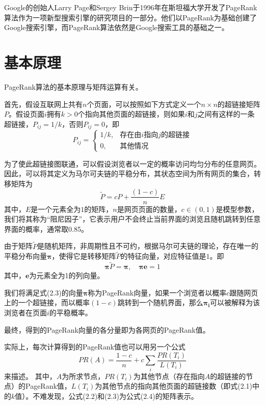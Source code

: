 \documentclass[UTF8,openany]{ctexbook}
\begin{document}
Google的创始人Larry Page和Sergey Brin于1996年在斯坦福大学开发了PageRank算法作为一项新型搜索引擎的研究项目的一部分。他们以PageRank为基础创建了Google搜索引擎，而PageRank算法依然是Google搜索工具的基础之一。

\section[基本原理]{基本原理}

PageRank算法的基本原理与矩阵运算有关。

首先，假设互联网上共有$n$个页面，可以按照如下方式定义一个$n \times n$的超链接矩阵$P$。假设页面$i$拥有$k>0$个指向其他页面的超链接，则如果$i$和$j$之间有这样的一条超链接，$P_{ij}=1/k$，否则$P_{ij}=0$，即
\begin{equation}
    P_{ij}=\begin{cases}
        1/k, & \text{存在由$i$指向$j$的超链接} \\
        0,   & \text{其他情况}
    \end{cases}
\end{equation}

为了使此超链接图联通，可以假设浏览者以一定的概率访问均匀分布的任意网页。因此，可以将其定义为马尔可夫链的平稳分布，其状态空间为所有网页的集合，转移矩阵为
\begin{equation}
    \widetilde{P}=cP+\frac{(1-c)}{n}E
\end{equation}
其中，$E$是一个元素全为$1$的矩阵，$n$是网页页面的数量，$c \in (0,1)$是模型参数，我们将其称为“阻尼因子”，它表示用户不会终止当前界面的浏览且随机跳转到任意界面的概率，通常取0.85\cite{bi:G}。

由于矩阵$\widetilde{P}$是随机矩阵，非周期性且不可约，根据马尔可夫链的理论\cite{bi:RA}，存在唯一的平稳分布向量$\boldsymbol{\pi}$，使得它是转移矩阵$\widetilde{P}$的特征向量，对应特征值是$1$\cite{bi:DGPOLS}。即
\begin{equation}
    \boldsymbol{\pi} \widetilde{P}=\boldsymbol{\pi},\quad\boldsymbol{\pi}\boldsymbol{e}=1
\end{equation}
其中，$\boldsymbol{e}$为元素全为1的列向量。

我们将满足式(2.3)的向量$\boldsymbol{\pi}$称为PageRank向量，如果一个浏览者以概率$c$跟随网页上的一个超链接，而以概率$(1-c)$跳转到一个随机界面，那么$\boldsymbol{\pi_i}$可以被解释为该浏览者在页面$i$的平稳概率。

最终，得到的PageRank向量的各分量即为各网页的PageRank值。

实际上，每次计算得到的PageRank值也可以用另一个公式
\begin{equation}
    PR(A)=\frac{1-c}{n} + c\sum_i \frac{PR(T_i)}{L(T_i)}
\end{equation}
来描述。
其中，$A$为所求节点，$PR(T_i)$为其他节点（存在指向$A$的超链接的节点）的PageRank值，$L(T_i)$为其他节点的指向其他页面的超链接数（即式(2.1)中的$k$值）。不难发现，公式(2.2)和(2.3)为公式(2.4)的矩阵表示。
\end{document}

